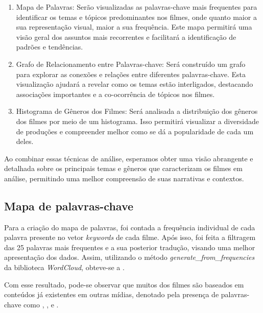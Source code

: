 \begin{enumerate}
\item Mapa de Palavras: Serão visualizadas as palavras-chave mais frequentes para identificar os temas e tópicos predominantes nos filmes, onde quanto maior a sua representação visual, maior a sua frequência. Este mapa permitirá uma visão geral dos assuntos mais recorrentes e facilitará a identificação de padrões e tendências.

\item Grafo de Relacionamento entre Palavras-chave: Será construído um grafo para explorar as conexões e relações entre diferentes palavras-chave. Esta visualização ajudará a revelar como os temas estão interligados, destacando associações importantes e a co-ocorrência de tópicos nos filmes.

\item Histograma de Gêneros dos Filmes: Será analisada a distribuição dos gêneros dos filmes por meio de um histograma. Isso permitirá visualizar a diversidade de produções e compreender melhor como se dá a popularidade de cada um deles.
\end{enumerate}

Ao combinar essas técnicas de análise, esperamos obter uma visão abrangente e detalhada sobre os principais temas e gêneros que caracterizam os filmes em análise, permitindo uma melhor compreensão de suas narrativas e contextos.

\subsection{Mapa de palavras-chave} \label{mapa-de-palavras}
Para a criação do mapa de palavras, foi contada a frequência individual de cada palavra presente no vetor \textit{keywords} de cada filme. Após isso, foi feita a filtragem das 25 palavras mais frequentes e a sua posterior tradução, visando uma melhor apresentação dos dados. Assim, utilizando o método \textit{generate\_from\_frequencies} da biblioteca \textit{WordCloud}\cite{wordcloud}, obteve-se a .

%

Com esse resultado, pode-se observar que muitos dos filmes são baseados em conteúdos já existentes em outras mídias, denotado pela presença de palavras-chave como , ,  e .


